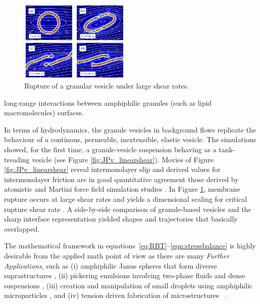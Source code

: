 \begin{figure}
\vspace{-10pt}
\includegraphics[width=0.475\textwidth]{figures/PreliminaryWork/Rupture.jpg}
\caption{\label{fig:JPv_rupture} \footnotesize Rupture of a granular
  vesicle under large shear rates.}
\end{figure}
\noindent long-range interactions between amphiphilic
granules (such as lipid macromolecules) surfaces.

In terms of hydrodynamics, the granule vesicles in background flows
replicate the behaviour of a continous, permeable, inextensible,
elastic vesicle.
The simulations showed, for the first time, a
granule-vesicle suspension behaving as a tank-treading vesicle
\cite{Finken2008, Shaqfeh11} (see Figure \ref{fig:JPv_linearshear}).
Movies of Figure \ref{fig:JPv_linearshear} reveal intermonolayer slip
and derived values for intermonolayer friction are in good quantitative
agreement those derived by atomistic and Martini force field simulation
studies \cite{WuoEd06, denOtter2007, SHKULIPA2005823, Zgorski2019}. In
Figure \ref{fig:JPv_rupture}, membrane rupture occurs at large shear
rates and yields a dimensional scaling for critical rupture shear rate
\cite{VLAHOVSKA2009775,keller_skalak_1982}. A side-by-side comparison of
granule-based vesicles and the sharp interface representation yielded
shapes and trajectories that basically overlapped.

The mathematical framework in equations~\eqref{eq:RBT}--\eqref{eqn:stressbalance}
is highly desirable from the applied math point of view as there are many
\emph{Further Applications}, such as
(i) amphiphilic Janus spheres that form diverse suprastructures
\cite{HaBr20,McBr21,Bradley2017},
(ii) pickering emulsions involving
two-phase fluids and dense suspensions \cite{Bradley2016},
(iii) creation and manipulation of small droplets
using amphiphilic microparticles \cite{Ha2022SurfaceEM,Ha2020MinimalSC},
and (iv) tension driven fabrication of microstructures
~\cite{Dasgupta2017, Leong2007, Reynolds2019, Cho2010,Zeng20223DprintedMT,Russell2016EnergyLF}.

